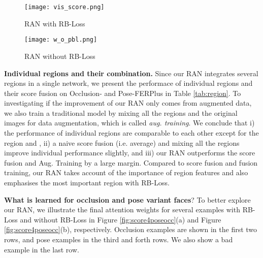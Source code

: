 \documentclass[journal]{IEEEtran}
\newcommand{\kwang}[1]{\textcolor[rgb]{0,0,0}{#1}}
\newcommand{\rpxj}[1]{\textcolor[rgb]{0,0,0}{#1}}
\newcommand{\peng}[1]{\textcolor[rgb]{0,0,0}{#1}}
\begin{document}
\begin{figure*}[t]
\begin{subfigure}{.5\textwidth}
  \centering
\texttt{[image: vis\_score.png]}  
  \caption{RAN with RB-Loss }
  \label{fig:sub-first}
\end{subfigure}
\begin{subfigure}{.5\textwidth}
  \centering
\texttt{[image: w\_o\_pbl.png]}  
  \caption{RAN without RB-Loss }
  \label{fig:sub-first}
\end{subfigure}
\caption{Illustration of learned attention weights for different regions along with origianl faces.  denotes the softmax function. Red-filled boxes indicate the highest weights while blue-filled ones are the lowest weights. From left to right, the columns represent the original faces, regions  to . Note that the left and right figures show the weights obtained with and without the RBLoss respectively. Better viewed in PDF.}
\label{fig:score4poseocc}
\end{figure*}

\textbf{\peng{Individual regions and their combination.}}
\rpxj{Since our RAN integrates several regions in a single network, we present the performace of individual regions and their score fusion on Occlusion- and Pose-FERPlus in Table \ref{tab:region}. To investigating if the improvement of our RAN only comes from augmented data, we also train a traditional model by mixing all the regions and the original images for data augmentation, which is called \textit{aug. training}. We conclude that i) the performance of individual regions are comparable to each other except for the region  and , ii) a naive score fusion (i.e. average) and mixing all the regions improve individual performance slightly, and iii) our RAN outperforms the score fusion and Aug. Training by a large margin. Compared to score fusion and fusion training, our RAN takes account of the importance of region features and also emphasises the most important region with RB-Loss.}




\textbf{What is learned for occlusion and pose variant faces}?
To better explore our RAN, we illustrate the final attention weights for several examples with RB-Loss and without RB-Loss in Figure \ref{fig:score4poseocc}(a) and Figure \ref{fig:score4poseocc}(b), respectively. 
\kwang{Occlusion examples are shown in the first two rows, and pose examples in the third and forth rows. We also show a bad example in the last row.}
\end{document}
